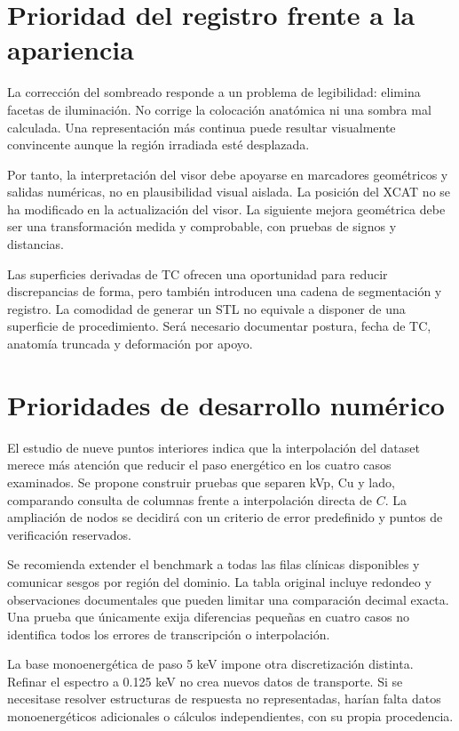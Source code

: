 \section{Prioridad del registro frente a la apariencia}
La corrección del sombreado responde a un problema de legibilidad: elimina facetas de iluminación. No corrige la colocación anatómica ni una sombra mal calculada. Una representación más continua puede resultar visualmente convincente aunque la región irradiada esté desplazada.

Por tanto, la interpretación del visor debe apoyarse en marcadores geométricos y salidas numéricas, no en plausibilidad visual aislada. La posición del XCAT no se ha modificado en la actualización del visor. La siguiente mejora geométrica debe ser una transformación medida y comprobable, con pruebas de signos y distancias.

Las superficies derivadas de TC ofrecen una oportunidad para reducir discrepancias de forma, pero también introducen una cadena de segmentación y registro. La comodidad de generar un STL no equivale a disponer de una superficie de procedimiento. Será necesario documentar postura, fecha de TC, anatomía truncada y deformación por apoyo.

\section{Prioridades de desarrollo numérico}
El estudio de nueve puntos interiores indica que la interpolación del dataset merece más atención que reducir el paso energético en los cuatro casos examinados. Se propone construir pruebas que separen kVp, Cu y lado, comparando consulta de columnas frente a interpolación directa de $C$. La ampliación de nodos se decidirá con un criterio de error predefinido y puntos de verificación reservados.

Se recomienda extender el benchmark a todas las filas clínicas disponibles y comunicar sesgos por región del dominio. La tabla original incluye redondeo y observaciones documentales que pueden limitar una comparación decimal exacta. Una prueba que únicamente exija diferencias pequeñas en cuatro casos no identifica todos los errores de transcripción o interpolación.

La base monoenergética de paso 5 keV impone otra discretización distinta. Refinar el espectro a \num{0.125} keV no crea nuevos datos de transporte. Si se necesitase resolver estructuras de respuesta no representadas, harían falta datos monoenergéticos adicionales o cálculos independientes, con su propia procedencia.

